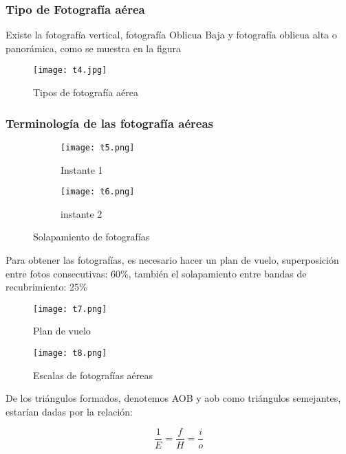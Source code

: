 \subsubsection{Tipo de Fotografía aérea}

Existe la fotografía vertical, fotografía Oblicua Baja y fotografía oblicua alta o panorámica, como se muestra en la figura

\begin{figure}[h!]
  \centerline{\texttt{[image: t4.jpg]}}
  \caption{Tipos de fotografía aérea}
  \label{t4}
\end{figure}

\subsubsection{Terminología de las fotografía aéreas}

\begin{figure}[h!]
\centering
\begin{subfigure}[b]{0.45\linewidth}
\texttt{[image: t5.png]}
\caption{Instante 1}
\label{t5}
\end{subfigure}
\begin{subfigure}[b]{0.45\linewidth}
\texttt{[image: t6.png]}
\caption{instante 2}
\label{t6}
\end{subfigure}
\caption{Solapamiento de fotografías}
\label{t5-6}
\end{figure}

Para obtener las fotografías, es necesario hacer un plan de vuelo,
superposición entre fotos consecutivas: 60\%, también el solapamiento entre bandas de recubrimiento: 25\%

\begin{figure}[h!]
  \centerline{\texttt{[image: t7.png]}}
  \caption{Plan de vuelo}
  \label{t7}
\end{figure}

\begin{figure}[h!]
  \centerline{\texttt{[image: t8.png]}}
  \caption{Escalas de fotografías aéreas}
  \label{t8}
\end{figure}

De los triángulos formados, denotemos AOB y aob como triángulos semejantes, estarían dadas por la relación: 

\begin{equation}
  \frac{1}{E}= \frac{f}{H}=\frac{i}{o}
\end{equation}

